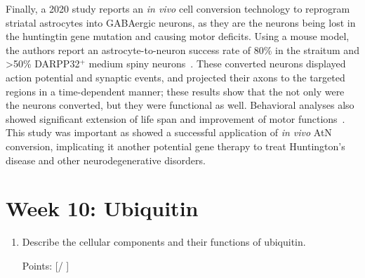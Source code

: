 \documentclass[plain,basic]{inVerba-notes}
\begin{document}
{\begin{enumerate}
\begin{enumerate}
{      Finally, a 2020 study reports an \textit{in vivo} cell conversion technology to reprogram striatal astrocytes into GABAergic neurons, as they are the neurons being lost in the huntingtin gene mutation and causing motor deficits. Using a mouse model, the authors report an astrocyte-to-neuron success rate of 80\% in the straitum and >50\% DARPP32\(^+\) medium spiny neurons~\cite{wu2020gene}. These converted neurons displayed action potential and synaptic events, and projected their axons to the targeted regions in a time-dependent manner; these results show that the not only were the neurons converted, but they were functional as well. Behavioral analyses also showed significant extension of life span and improvement of motor functions~\cite{wu2020gene}. This study was important as showed a successful application of \textit{in vivo} AtN conversion, implicating it another potential gene therapy to treat Huntington's disease and other neurodegenerative disorders.
    }
  \end{enumerate}
 \end{enumerate}

\section{Week 10: Ubiquitin}
\begin{enumerate}
  \item Describe the cellular components and their functions of ubiquitin. 
  
  Points: [\qquad / \qquad ]
  
\end{enumerate}}
\end{document}
